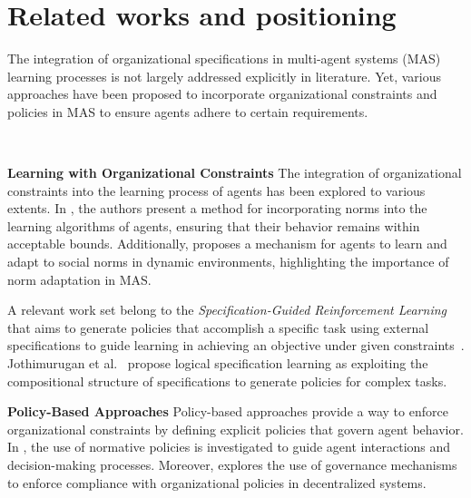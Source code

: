 \documentclass[runningheads]{llncs}
\theoremstyle{freethm}
\theoremstyle{proofoutline}
\begin{document}
\section{Related works and positioning}

The integration of organizational specifications in multi-agent systems (MAS) learning processes is not largely addressed explicitly in literature. Yet, various approaches have been proposed to incorporate organizational constraints and policies in MAS to ensure agents adhere to certain requirements.

\

\textbf{Learning with Organizational Constraints} \quad
%
The integration of organizational constraints into the learning process of agents has been explored to various extents. In \cite{cruz2020norms}, the authors present a method for incorporating norms into the learning algorithms of agents, ensuring that their behavior remains within acceptable bounds. Additionally, \cite{villatoro2011social} proposes a mechanism for agents to learn and adapt to social norms in dynamic environments, highlighting the importance of norm adaptation in MAS.

A relevant work set belong to the \emph{Specification-Guided Reinforcement Learning} that aims to generate policies that accomplish a specific task using external specifications to guide learning in achieving an objective under given constraints~\cite{Bansal2022}. Jothimurugan et al.~\cite{Jothimurugan2021} propose logical specification learning as exploiting the compositional structure of specifications to generate policies for complex tasks.

\textbf{Policy-Based Approaches} \quad
%
Policy-based approaches provide a way to enforce organizational constraints by defining explicit policies that govern agent behavior. In \cite{krupanski2015norm}, the use of normative policies is investigated to guide agent interactions and decision-making processes. Moreover, \cite{vos2020governing} explores the use of governance mechanisms to enforce compliance with organizational policies in decentralized systems.

\end{document}
